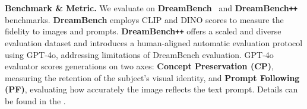 

\textbf{Benchmark \& Metric.} We evaluate \model on \textbf{DreamBench}~\citep{ruiz2023dreamboothfinetuningtexttoimage} and \textbf{DreamBench\texttt{++}}~\citep{peng2025dreambenchpp} benchmarks.
\textbf{DreamBench} employs CLIP and DINO scores to measure the fidelity to images and prompts.
\textbf{DreamBench\texttt{++}} offers a scaled and diverse evaluation dataset and introduces a human-aligned automatic evaluation protocol using GPT-4o, addressing limitations of DreamBench evaluation.
GPT-4o evaluator scores generations on two axes: \textbf{Concept Preservation (CP)}, measuring the retention of the subject's visual identity, and \textbf{Prompt Following (PF)}, evaluating how accurately the image reflects the text prompt.
Details can be found in the .






